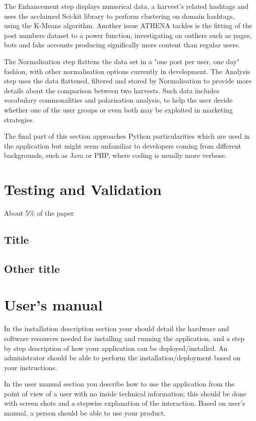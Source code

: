 \documentclass[12pt,a4paper,twoside]{report}
\begin{document}
The Enhancement step displays numerical data, a harvest's related hashtags and uses the acclaimed Sci-kit library to perform clustering on domain hashtags, using the K-Means algorithm. Another issue ATHENA tackles is the fitting of the post numbers dataset to a power function, investigating on outliers such as pages, bots and fake accounts producing significally more content than regular users.

The Normalisation step flattens the data set in a "one post per user, one day" fashion, with other normalisation options currently in development. The Analysis step uses the data flattened, filtered and stored by Normalisation to provide more details about the comparison between two harvests. Such data includes vocabulary commonalities and polarisation analysis, to help the user decide whether one of the user groups or even both may be exploited in marketing strategies.

The final part of this section approaches Python particularities which are used in the application but might seem unfamiliar to developers coming from different backgrounds, such as Java or PHP, where coding is usually more verbose.

\chapter{Testing and Validation}

About 5\% of the paper
\section{Title}
\section{Other title}

\chapter{User's manual}

In the installation description section your should detail the hardware and software resources needed for installing and running the application, and a step by step description of how your application can be deployed/installed. An administrator should be able to perform the installation/deployment based on your instructions.

In the user manual section you describe how to use the application from the point of view of a user with no inside technical information; this should be done with screen shots and a stepwise explanation of the interaction. Based on user's manual, a person should be able to use your product.
\end{document}
